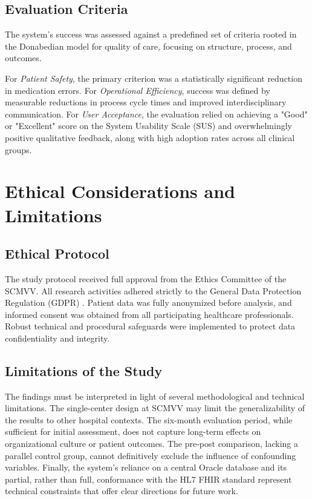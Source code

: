 \subsection{Evaluation Criteria}
The system's success was assessed against a predefined set of criteria rooted in the Donabedian model for quality of care, focusing on structure, process, and outcomes.

For \textit{Patient Safety}, the primary criterion was a statistically significant reduction in medication errors. For \textit{Operational Efficiency}, success was defined by measurable reductions in process cycle times and improved interdisciplinary communication. For \textit{User Acceptance}, the evaluation relied on achieving a "Good" or "Excellent" score on the System Usability Scale (SUS) and overwhelmingly positive qualitative feedback, along with high adoption rates across all clinical groups.

\section{Ethical Considerations and Limitations}

\subsection{Ethical Protocol}
The study protocol received full approval from the Ethics Committee of the SCMVV. All research activities adhered strictly to the General Data Protection Regulation (GDPR) \cite{european2016}. Patient data was fully anonymized before analysis, and informed consent was obtained from all participating healthcare professionals. Robust technical and procedural safeguards were implemented to protect data confidentiality and integrity.

\subsection{Limitations of the Study}
The findings must be interpreted in light of several methodological and technical limitations. The single-center design at SCMVV may limit the generalizability of the results to other hospital contexts. The six-month evaluation period, while sufficient for initial assessment, does not capture long-term effects on organizational culture or patient outcomes. The pre-post comparison, lacking a parallel control group, cannot definitively exclude the influence of confounding variables. Finally, the system's reliance on a central Oracle database and its partial, rather than full, conformance with the HL7 FHIR standard represent technical constraints that offer clear directions for future work.